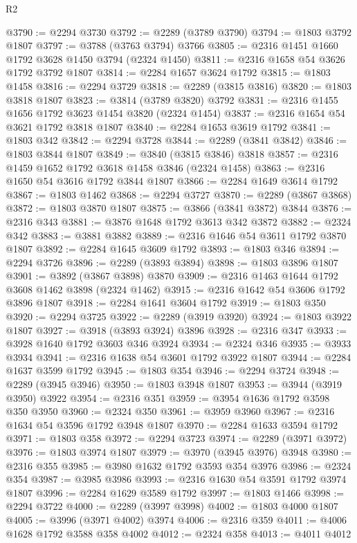 \begin{lexlean}{R2}
\begin{coremodule}
@3790 := @2294 @3730
@3792 := @2289 (@3789 @3790)
@3794 := @1803 @3792 @1807
@3797 := @3788 (@3763 @3794) @3766
@3805 := @2316 @1451 @1660 @1792 @3628 @1450 @3794 (@2324 @1450)
@3811 := @2316 @1658 @54 @3626 @1792 @3792 @1807
@3814 := @2284 @1657 @3624 @1792
@3815 := @1803 @1458
@3816 := @2294 @3729
@3818 := @2289 (@3815 @3816)
@3820 := @1803 @3818 @1807
@3823 := @3814 (@3789 @3820) @3792
@3831 := @2316 @1455 @1656 @1792 @3623 @1454 @3820 (@2324 @1454)
@3837 := @2316 @1654 @54 @3621 @1792 @3818 @1807
@3840 := @2284 @1653 @3619 @1792
@3841 := @1803 @342
@3842 := @2294 @3728
@3844 := @2289 (@3841 @3842)
@3846 := @1803 @3844 @1807
@3849 := @3840 (@3815 @3846) @3818
@3857 := @2316 @1459 @1652 @1792 @3618 @1458 @3846 (@2324 @1458)
@3863 := @2316 @1650 @54 @3616 @1792 @3844 @1807
@3866 := @2284 @1649 @3614 @1792
@3867 := @1803 @1462
@3868 := @2294 @3727
@3870 := @2289 (@3867 @3868)
@3872 := @1803 @3870 @1807
@3875 := @3866 (@3841 @3872) @3844
@3876 := @2316 @343
@3881 := @3876 @1648 @1792 @3613 @342 @3872
@3882 := @2324 @342
@3883 := @3881 @3882
@3889 := @2316 @1646 @54 @3611 @1792 @3870 @1807
@3892 := @2284 @1645 @3609 @1792
@3893 := @1803 @346
@3894 := @2294 @3726
@3896 := @2289 (@3893 @3894)
@3898 := @1803 @3896 @1807
@3901 := @3892 (@3867 @3898) @3870
@3909 := @2316 @1463 @1644 @1792 @3608 @1462 @3898 (@2324 @1462)
@3915 := @2316 @1642 @54 @3606 @1792 @3896 @1807
@3918 := @2284 @1641 @3604 @1792
@3919 := @1803 @350
@3920 := @2294 @3725
@3922 := @2289 (@3919 @3920)
@3924 := @1803 @3922 @1807
@3927 := @3918 (@3893 @3924) @3896
@3928 := @2316 @347
@3933 := @3928 @1640 @1792 @3603 @346 @3924
@3934 := @2324 @346
@3935 := @3933 @3934
@3941 := @2316 @1638 @54 @3601 @1792 @3922 @1807
@3944 := @2284 @1637 @3599 @1792
@3945 := @1803 @354
@3946 := @2294 @3724
@3948 := @2289 (@3945 @3946)
@3950 := @1803 @3948 @1807
@3953 := @3944 (@3919 @3950) @3922
@3954 := @2316 @351
@3959 := @3954 @1636 @1792 @3598 @350 @3950
@3960 := @2324 @350
@3961 := @3959 @3960
@3967 := @2316 @1634 @54 @3596 @1792 @3948 @1807
@3970 := @2284 @1633 @3594 @1792
@3971 := @1803 @358
@3972 := @2294 @3723
@3974 := @2289 (@3971 @3972)
@3976 := @1803 @3974 @1807
@3979 := @3970 (@3945 @3976) @3948
@3980 := @2316 @355
@3985 := @3980 @1632 @1792 @3593 @354 @3976
@3986 := @2324 @354
@3987 := @3985 @3986
@3993 := @2316 @1630 @54 @3591 @1792 @3974 @1807
@3996 := @2284 @1629 @3589 @1792
@3997 := @1803 @1466
@3998 := @2294 @3722
@4000 := @2289 (@3997 @3998)
@4002 := @1803 @4000 @1807
@4005 := @3996 (@3971 @4002) @3974
@4006 := @2316 @359
@4011 := @4006 @1628 @1792 @3588 @358 @4002
@4012 := @2324 @358
@4013 := @4011 @4012

\end{coremodule}
\end{lexlean}
